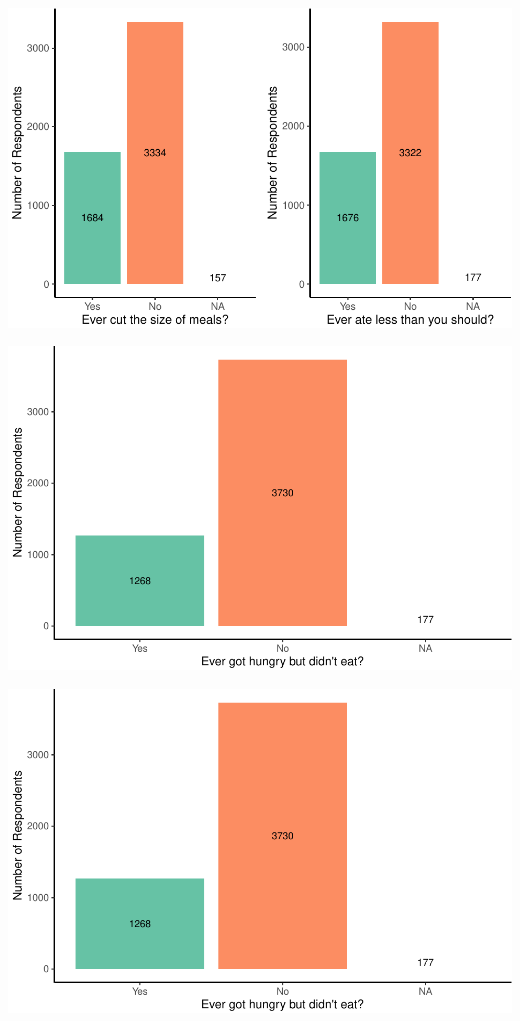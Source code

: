\documentclass[
  10pt,
]{article}
\begin{document}
\includegraphics{phase2_report_files/figure-latex/unnamed-chunk-7-1}

\includegraphics{phase2_report_files/figure-latex/unnamed-chunk-8-1}

\includegraphics{phase2_report_files/figure-latex/unnamed-chunk-9-1}
\end{document}
